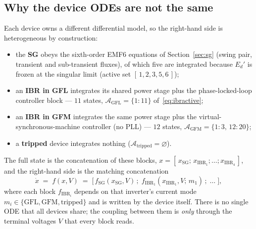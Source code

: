 \documentclass[12pt,a4paper]{article}
\begin{document}
\subsection{Why the device ODEs are not the same}\label{sec:ts-hetero}
Each device owns a different differential model, so the right-hand side is
heterogeneous by construction:
\begin{itemize}\itemsep2pt
  \item the \textbf{SG} obeys the sixth-order EMF6 equations of
        Section~\ref{sec:sg} (swing pair, transient and sub-transient fluxes),
        of which five are integrated because $E_d'$ is frozen at the
        singular limit (active set $[\,1,2,3,5,6\,]$);
  \item an \textbf{IBR in GFL} integrates its shared power stage plus the
        phase-locked-loop controller block --- $11$ states,
        $\mathcal{A}_{\mathrm{GFL}}=\{1{:}11\}$ of~\eqref{eq:ibractive};
  \item an \textbf{IBR in GFM} integrates the same power stage plus the
        virtual-synchronous-machine controller (no PLL) --- $12$ states,
        $\mathcal{A}_{\mathrm{GFM}}=\{1{:}3,\,12{:}20\}$;
  \item a \textbf{tripped} device integrates nothing
        ($\mathcal{A}_{\mathrm{tripped}}=\varnothing$).
\end{itemize}
The full state is the concatenation of these blocks,
$x=[\,x_{\mathrm{SG}};\,x_{\mathrm{IBR}_1};\dots;x_{\mathrm{IBR}_4}\,]$, and the
right-hand side is the matching concatenation
\begin{equation}
  \dot x \;=\; f(x,V)\;=\;
  \bigl[\,f_{\mathrm{SG}}(x_{\mathrm{SG}},V)\,;\;
          f_{\mathrm{IBR}_1}(x_{\mathrm{IBR}_1},V;\,m_1)\,;\;\dots\;\bigr],
  \label{eq:stackf}
\end{equation}
where each block $f_{\mathrm{IBR}_i}$ depends on that inverter's current mode
$m_i\in\{\mathrm{GFL},\mathrm{GFM},\mathrm{tripped}\}$ and is written by the
device itself. There is no single ODE that all devices share; the coupling
between them is \emph{only} through the terminal voltages $V$ that every block
reads.
\end{document}
